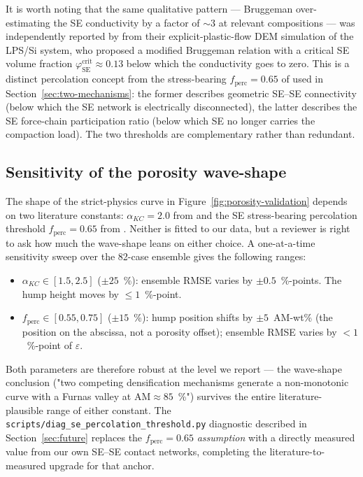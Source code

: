 \documentclass[11pt, a4paper]{article}
\begin{document}
It is worth noting that the same qualitative pattern --- Bruggeman
over-estimating the SE conductivity by a factor of $\sim 3$ at
relevant compositions --- was independently reported by
\citet{So2021} from their explicit-plastic-flow DEM simulation of
the LPS/Si system, who proposed a modified Bruggeman relation with
a critical SE volume fraction $\varphi_{\mathrm{SE}}^{\mathrm{crit}}
\approx 0.13$ below which the conductivity goes to zero.  This is a
distinct percolation concept from the stress-bearing
$f_{\mathrm{perc}} = 0.65$ of \citet{LiuYin2025} used in
Section~\ref{sec:two-mechanisms}: the former describes geometric
SE--SE connectivity (below which the SE network is electrically
disconnected), the latter describes the SE force-chain participation
ratio (below which SE no longer carries the compaction load).  The
two thresholds are complementary rather than redundant.

\subsection{Sensitivity of the porosity wave-shape}
\label{sec:sensitivity}
The shape of the strict-physics curve in
Figure~\ref{fig:porosity-validation} depends on two literature
constants: $\alpha_{KC} = 2.0$ from \citet{Sridhar2000} and the
SE stress-bearing percolation threshold $f_{\mathrm{perc}} = 0.65$
from \citet{LiuYin2025}. Neither is fitted to our data, but a
reviewer is right to ask how much the wave-shape leans on either
choice. A one-at-a-time sensitivity sweep over the 82-case
ensemble gives the following ranges:

  \begin{itemize}
  \item $\alpha_{KC} \in [1.5, 2.5]$ ($\pm 25$~\%):
        ensemble RMSE varies by $\pm 0.5$~\%-points.  The hump
        height moves by $\le 1$~\%-point.
  \item $f_{\mathrm{perc}} \in [0.55, 0.75]$ ($\pm 15$~\%):
        hump position shifts by $\pm 5$~AM-wt\% (the position
        on the abscissa, not a porosity offset); ensemble RMSE
        varies by $< 1$~\%-point of $\varepsilon$.
  \end{itemize}

Both parameters are therefore robust at the level we report — the
wave-shape conclusion ("two competing densification mechanisms
generate a non-monotonic curve with a Furnas valley at
$\mathrm{AM}\approx 85$~\%") survives the entire literature-
plausible range of either constant. The
\texttt{scripts/diag\_se\_percolation\_threshold.py} diagnostic
described in Section~\ref{sec:future} replaces the
$f_{\mathrm{perc}} = 0.65$ \emph{assumption} with a directly
measured value from our own SE--SE contact networks, completing
the literature-to-measured upgrade for that anchor.
\end{document}
